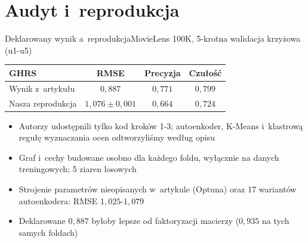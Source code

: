 \documentclass[red]{beamer}
\begin{document}
    \section{Audyt i~reprodukcja}
    \begin{frame}{Deklarowany wynik a~reprodukcja}{MovieLens 100K, 5-krotna walidacja krzyżowa (u1-u5)}
        \small
        \begin{center}
            \begin{tabular}{lccc}
                \toprule
                \textbf{GHRS} & \textbf{RMSE} & \textbf{Precyzja} & \textbf{Czułość} \\
                \midrule
                Wynik z~artykułu & $0{,}887$ & $0{,}771$ & $0{,}799$ \\
                Nasza reprodukcja & $1{,}076 \pm 0{,}001$ & $0{,}664$ & $0{,}724$ \\
                \bottomrule
            \end{tabular}
        \end{center}
        \begin{itemize}
            \item Autorzy udostępnili tylko kod kroków 1-3; autoenkoder, K-Means
                  i~klastrową regułę wyznaczania ocen odtworzyliśmy według opisu
            \item Graf i~cechy budowane osobno dla każdego foldu, wyłącznie na danych
                  treningowych; 5 ziaren losowych
            \item Strojenie parametrów nieopisanych w~artykule (Optuna) oraz
                  17 wariantów autoenkodera: RMSE $1{,}025$-$1{,}079$
            \item Deklarowane $0{,}887$ byłoby lepsze od faktoryzacji macierzy
                  ($0{,}935$ na tych samych foldach)
        \end{itemize}
    \end{frame}
\end{document}
